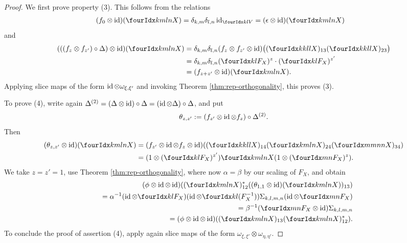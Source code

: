 \begin{proof}
    We first prove property (3). This follows from the relations
    \begin{align*}
      (f_{0}  \otimes \id)(\Gr{X}{k}{l}{m}{n}) &=
      \delta_{k,m}\delta_{l,n} \id_{\Gru{V}{k}{l}} =
      (\epsilon \otimes \id)(\Gr{X}{k}{l}{m}{n})
    \end{align*}
    and
    \begin{align*}
      (((f_{z}\otimes f_{z'})\circ \Delta) \otimes
      \id)(\Gr{X}{k}{l}{m}{n}) &=  \delta_{k,m}\delta_{l,n}(f_{z} \otimes f_{z'} \otimes
      \id)\big((\Gr{X}{k}{l}{k}{l})_{13}
      (\Gr{X}{k}{l}{k}{l})_{23}\big) \\
      &=  \delta_{k,m}\delta_{l,n}(\Gru{F_{X}}{k}{l})^{z}  \cdot (\Gru{F_{X}}{k}{l})^{z'} \\
      &= (f_{z+z'} \otimes \id)(\Gr{X}{k}{l}{m}{n}).
    \end{align*}
    Applying slice maps of the form $\operatorname{id}
    \otimes \omega_{\xi,\xi'}$ and invoking Theorem \ref{thm:rep-orthogonality}, this proves (3).

    To prove (4), write again $ \Delta^{(2)} = (
    \Delta \otimes \operatorname{id})\circ  \Delta = (\operatorname{id} \otimes 
    \Delta) \circ \Delta$, and put \[\theta_{z,z'}:=(f_{z'} \otimes \operatorname{id}
    \otimes f_{z})\circ  \Delta^{(2)}.\] Then
    \begin{align*}
      (\theta_{z,z'} \otimes \id)(\Gr{X}{k}{l}{m}{n}) &= (f_{z'} \otimes
      \id \otimes f_{z} \otimes
      \id)((\Gr{X}{k}{l}{k}{l})_{14}(\Gr{X}{k}{l}{m}{n})_{24}(\Gr{X}{m}{n}{m}{n})_{34})
      \\
      &= (1 \otimes (\Gru{F_{X}}{k}{l})^{z'}) \Gr{X}{k}{l}{m}{n} (1
      \otimes (\Gru{F_{X}}{m}{n})^{z}).
    \end{align*}
    We take $z=z'=1$, use Theorem \ref{thm:rep-orthogonality}, where
    now $\alpha= \beta$ by our scaling of $F_{X}$, and obtain
    \begin{eqnarray*}
     && \hspace{-2cm} (\phi \otimes \id \otimes
      \id)((\Gr{X}{k}{l}{m}{n})_{12}^{*}((\theta_{1,1} \otimes
      \id)(\Gr{X}{k}{l}{m}{n}))_{13})\\ && =\alpha^{-1}(\id \otimes
      \Gru{F_{X}}{k}{l}) (\id \otimes \Gru{(F_{X}^{-1})}{k}{l})
      \Sigma_{k,l,m,n} (\id \otimes
      \Gru{F_{X}}{m}{n}) \\
      &&=\beta^{-1}(\Gru{F_{X}}{m}{n} \otimes \id) \Sigma_{k,l,m,n} \\
      &&= (\phi \otimes \id \otimes
      \id)((\Gr{X}{k}{l}{m}{n})_{13}(\Gr{X}{k}{l}{m}{n})_{12}^{*}).
    \end{eqnarray*}
    To conclude the proof of assertion (4), apply again slice maps of the form
    $\omega_{\xi,\xi'} \otimes \omega_{\eta,\eta'}$.


\end{proof}
